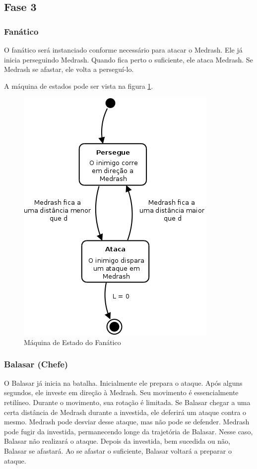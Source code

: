 \subsection{Fase 3}

\subsubsection{Fanático}

O fanático será instanciado conforme necessário para atacar o Medrash.
Ele já inicia perseguindo Medrash. Quando fica perto o suficiente, ele
ataca Medrash. Se Medrash se afastar, ele volta a perseguí-lo.

A máquina de estados pode ser vista na figura \ref{fsm:fanatico}.

\begin{figure}[!ht]
 \centering
 \includegraphics[scale=0.35]{ia_fanatico.png}
 \caption{Máquina de Estado do Fanático}
 \label{fsm:fanatico}
\end{figure}

\subsubsection{Balasar (Chefe)}

O Balasar já inicia na batalha. Inicialmente ele prepara o ataque.
Após alguns segundos, ele investe em direção à Medrash. Seu movimento
é essencialmente retilíneo. Durante o movimento, sua rotação é limitada.
Se Balasar chegar a uma certa distância de Medrash durante a investida,
ele deferirá um ataque contra o mesmo. Medrash pode desviar desse ataque,
mas não pode se defender. Medrash pode fugir da investida, permanecendo
longe da trajetória de Balasar. Nesse caso, Balasar não realizará o ataque.
Depois da investida, bem sucedida ou não, Balasar se afastará.
Ao se afastar o suficiente, Balasar voltará a preparar o ataque.

